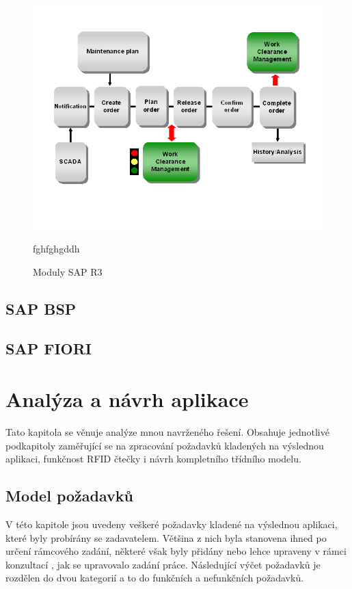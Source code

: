 \documentclass[thesis=M,czech]{FITthesis}[2012/06/26]
\begin{document}
\begin{figure}[H]
	\centering
	\includegraphics[width=1\textwidth]{images/pm_process.png}
	\caption{Moduly SAP R3}
	\label{img:sapr3}
	\small
	fghfghgddh
\end{figure}












\section{SAP BSP}

\section{SAP FIORI}

\chapter{Analýza a návrh aplikace}
Tato kapitola se věnuje analýze mnou navrženého řešení. Obsahuje jednotlivé podkapitoly zaměřující se na zpracování požadavků kladených na výslednou aplikaci, funkčnost RFID čtečky i návrh kompletního třídního modelu.	

\section{Model požadavků}
V této kapitole jsou uvedeny veškeré požadavky kladené na  výslednou aplikaci, které byly probírány se zadavatelem. Většina z nich byla stanovena ihned po určení rámcového zadání, některé však byly přidány nebo lehce upraveny v rámci konzultací , jak se upravovalo zadání práce. Následující výčet požadavků je rozdělen do dvou kategorií a to do funkčních a nefunkčních požadavků.  
\end{document}
